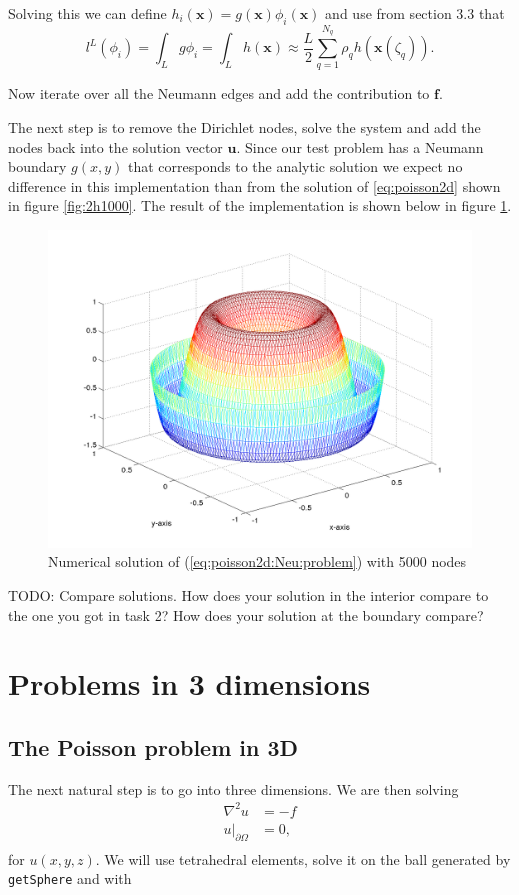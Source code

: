 \documentclass[paper=a4, fontsize=11pt]{scrartcl} %
\begin{document}
Solving this we can define $h_i(\mathbf{x})=g(\mathbf{x})\phi_i(\mathbf{x})$ and use from section 3.3 that 
\[
l^L(\phi_i)=\int_{L} \! g \phi_i = \int_{L} \! h(\mathbf{x}) \approx \frac{L}{2}\sum_{q=1}^{N_q} \rho_{q}h(\mathbf{x}(\zeta_q)).\]

Now iterate over all the Neumann edges and add the contribution to $\mathbf{f}$.

The next step is to remove the Dirichlet nodes, solve the system and add the nodes back into the solution vector $\mathbf{u}$.  Since our test problem has a Neumann boundary $g(x,y)$ that corresponds to the analytic solution we expect no difference in this implementation than from the solution of \eqref{eq:poisson2d} shown in figure \ref{fig:2h1000}. The result of the implementation is shown below in figure \ref{fig:3d5000}.

\begin{figure}[!htb]
  \includegraphics[width=\linewidth]{3d5000.png}
  \caption{Numerical solution of (\ref{eq:poisson2d:Neu:problem}) with 5000 nodes}\label{fig:3d5000}
\end{figure}

TODO: Compare solutions. How does your solution in the interior compare to the one you got in task 2? How does your solution at the boundary compare?

\section{Problems in 3 dimensions}
\subsection{The Poisson problem in 3D}
The next natural step is to go into three dimensions. We are then  solving
\begin{equation}
\begin{aligned}
\nabla^2 u 	&= -f \\
\left. u\right|_{\partial\Omega} 	&= 0, \\
\end{aligned}
\label{eq:poisson3d}
\end{equation}
for $u(x,y,z)$. We will use tetrahedral elements, solve it on the ball generated by \texttt{getSphere} and with
\end{document}
